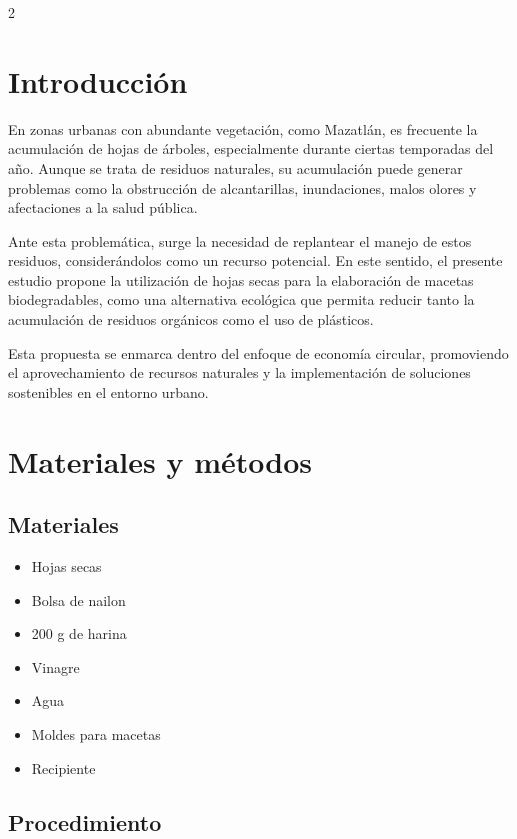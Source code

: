     \begin{multicols}{2}
    

\section{Introducción}

En zonas urbanas con abundante vegetación, como Mazatlán, es frecuente la acumulación de hojas de árboles, especialmente durante ciertas temporadas del año. Aunque se trata de residuos naturales, su acumulación puede generar problemas como la obstrucción de alcantarillas, inundaciones, malos olores y afectaciones a la salud pública.

Ante esta problemática, surge la necesidad de replantear el manejo de estos residuos, considerándolos como un recurso potencial. En este sentido, el presente estudio propone la utilización de hojas secas para la elaboración de macetas biodegradables, como una alternativa ecológica que permita reducir tanto la acumulación de residuos orgánicos como el uso de plásticos.

Esta propuesta se enmarca dentro del enfoque de economía circular, promoviendo el aprovechamiento de recursos naturales y la implementación de soluciones sostenibles en el entorno urbano.

\section{Materiales y métodos}

\subsection{Materiales}

\begin{itemize}
    \item Hojas secas
    \item Bolsa de nailon
    \item 200 g de harina
    \item Vinagre
    \item Agua 
    \item Moldes para macetas
    \item Recipiente
\end{itemize}

\subsection{Procedimiento}


\end{multicols}
